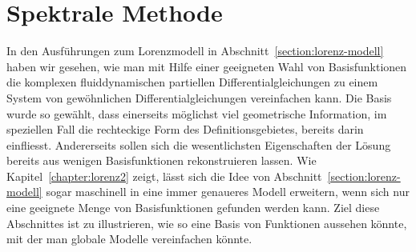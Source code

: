 %
%
%
\section{Spektrale Methode}
In den Ausführungen zum Lorenzmodell in Abschnitt~\ref{section:lorenz-modell}
haben wir gesehen, wie man mit Hilfe einer geeigneten Wahl von Basisfunktionen
die komplexen fluiddynamischen partiellen Differentialgleichungen zu einem
System von gewöhnlichen Differentialgleichungen vereinfachen kann.
Die Basis wurde so gewählt, dass einerseits möglichst viel geometrische
Information, im speziellen Fall die rechteckige Form des Definitionsgebietes,
bereits darin einfliesst.
Andererseits sollen sich die wesentlichsten Eigenschaften der Lösung bereits
aus wenigen Basisfunktionen rekonstruieren lassen.
Wie Kapitel~\ref{chapter:lorenz2} zeigt, lässt sich die Idee von
Abschnitt~\ref{section:lorenz-modell} sogar maschinell in eine
immer genaueres Modell erweitern, wenn sich nur eine geeignete Menge
von Basisfunktionen gefunden werden kann.
Ziel diese Abschnittes ist zu illustrieren, wie so eine Basis von
Funktionen aussehen könnte, mit der man globale Modelle vereinfachen
könnte.






